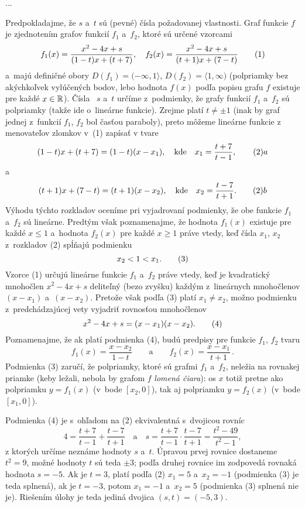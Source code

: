 {%
...}

{%
Predpokladajme, že $s$ a~$t$ sú (pevné) čísla
požadovanej vlastnosti. Graf funkcie $f$ je zjednotením grafov
funkcií $f_1$ a~$f_2$, ktoré sú určené vzorcami
$$
f_1(x)=\frac{x^2-4x+s}{(1-t)x+(t+7)},\quad
f_2(x)=\frac{x^2-4x+s}{(t+1)x+(7-t)}
\tag1$$
a~majú definičné obory  $D(f_1)=({-\infty},1\rangle$,
$D(f_2)=\langle1,\infty)$ (polpriamky bez akýchkoľvek vylúčených
bodov, lebo hodnota $f(x)$ podľa popisu grafu $f$ existuje pre každé
$x\in {\Bbb R}$). Čísla~ $s$ a~$t$ určíme z~podmienky, že grafy funkcií
$f_1$ a~$f_2$ sú polpriamky (takže ide o~lineárne funkcie).
Zrejme platí $t\ne\pm1$ (inak by graf jednej z~funkcií $f_1$,
$f_2$ bol časťou paraboly), preto môžeme lineárne funkcie z
menovateľov zlomkov v~(1) zapísať v tvare
$$
(1-t)x+(t+7)=(1-t)(x-x_1),\quad\text{kde}\quad
x_1=\frac{t+7}{t-1},
\tag2a
$$
a~$$
(t+1)x+(7-t)=(t+1)(x-x_2),\quad\text{kde}\quad
x_2=\frac{t-7}{t+1}.
\tag2b$$
Výhodu týchto rozkladov oceníme pri vyjadrovaní podmienky, že obe
funkcie $f_1$ a~$f_2$ sú lineárne. Predtým však poznamenajme,
že hodnota $f_1(x)$ existuje  pre každé $x\leq1$
a~hodnota $f_2(x)$ pre každé $x\geq1$ práve vtedy, keď čísla
$x_1$, $x_2$ z~rozkladov (2) spĺňajú podmienku
$$
x_2<1<x_1.
\tag3
$$
Vzorce (1)
určujú lineárne funkcie $f_1$ a~$f_2$ práve vtedy, keď je
kvadratický mnohočlen $x^2-4x+s$ deliteľný (bezo zvyšku)
každým z~lineárnych mnohočlenov $(x-x_1)$ a~$(x-x_2)$. Pretože
však podľa (3) platí $x_1\ne x_2$, možno podmienku z~predchádzajúcej
vety vyjadriť rovnosťou mnohočlenov
$$
x^2-4x+s=(x-x_1)(x-x_2).
\tag4
$$
Poznamenajme, že ak platí podmienka (4), budú predpisy pre funkcie $f_1$,
$f_2$ tvaru
$$
f_1(x)=\frac{x-x_2}{1-t}\qquad\text{a}\qquad
f_2(x)=\frac{x-x_1}{t+1} \,.
$$
Podmienka (3) zaručí, že polpriamky, ktoré sú grafmi
$f_1$ a~$f_2$, neležia na rovnakej priamke (keby ležali, nebola by
grafom $f$ {\it lomená čiara\/}): os $x$ totiž pretne ako pol\-priam\-ku
$y=f_1(x)$ (v~bode $[x_2,0]$), tak aj polpriamku $y=f_2(x)$
(v~bode $[x_1,0]$).

Podmienka (4) je s~ohľadom na (2) ekvivalentná s~dvojicou rovníc
$$
4=\frac{t+7}{t-1}+\frac{t-7}{t+1}\quad\text{a}\quad
s=\frac{t+7}{t-1}\cdot\frac{t-7}{t+1}=\frac{t^2-49}{t^2-1},
$$
z ktorých určíme neznáme hodnoty $s$ a~$t$.
Úpravou prvej rovnice dostaneme $t^2=9$, možné hodnoty $t$ sú teda
$\pm3$; podľa druhej rovnice im zodpovedá rovnaká
hodnota $s={-5}$.
Ak je $t=3$, platí podľa (2) $x_1=5$ a~$x_2={-1}$ (podmienka (3)
je teda splnená), ak je $t={-3}$, potom $x_1={-1}$ a~$x_2=5$
(podmienka (3) splnená nie je). Riešením úlohy je teda jediná dvojica
$(s,t)=({-5},3)$.

}
